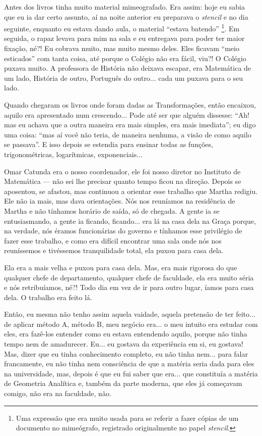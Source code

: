 \documentclass{hipatia}
\begin{document}
Antes dos livros tinha muito material mimeografado. Era assim: hoje eu
sabia que eu ia dar certo assunto, aí na noite anterior eu preparava o
\emph{stencil} e no dia seguinte, enquanto eu estava dando aula, o
material ``estava batendo'' \footnote{Uma expressão que era muito usada
  para se referir a fazer cópias de um documento no mimeógrafo,
  registrado originalmente no papel \emph{stencil}.}. Em seguida, o
rapaz levava para mim na sala e eu entregava para poder ter maior
fixação, né?! Eu cobrava muito, mas muito mesmo deles. Eles ficavam
``meio esticados'' com tanta coisa, até porque o Colégio não era fácil,
viu?! O Colégio puxava muito. A professora de História não deixava
escapar, era Matemática de um lado, História de outro, Português do
outro... cada um puxava para o seu lado.

Quando chegaram os livros onde foram dadas as Transformações, então
encaixou, aquilo era apresentado num crescendo... Pode até ser que
alguém dissesse: ``Ah! mas eu achava que a outra maneira era mais
simples, era mais imediata''; eu digo uma coisa: ``mas aí você não
teria, de maneira nenhuma, a visão de como aquilo se passava''. E isso
depois se estendia para ensinar todas as funções, trigonométricas,
logarítmicas, exponenciais...

Omar Catunda era o nosso coordenador, ele foi nosso diretor no Instituto
de Matemática --- não sei lhe precisar quanto tempo ficou na direção.
Depois se aposentou, se afastou, mas continuou a orientar esse trabalho
que Martha redigiu. Ele não ia mais, mas dava orientações. Nós nos
reuníamos na residência de Martha e não tínhamos horário de saída, só de
chegada. A gente ia se entusiasmando, a gente ia ficando, ficando... era
lá na casa dela na Graça porque, na verdade, nós éramos funcionárias do
governo e tínhamos esse privilégio de fazer esse trabalho, e como era
difícil encontrar uma sala onde nós nos reuníssemos e tivéssemos
tranquilidade total, ela puxou para casa dela.

Ela era a mais velha e puxou para casa dela. Mas, era mais rigorosa do
que qualquer chefe de departamento, qualquer chefe de faculdade, ela era
muito séria e nós retribuíamos, né?! Todo dia em vez de ir para outro
lugar, íamos para casa dela. O trabalho era feito lá.

Então, eu mesma não tenho assim aquela vaidade, aquela pretensão de ter
feito... de aplicar método A, método B, meu negócio era... o meu intuito
era estudar com eles, era fazê-los entender como eu estava entendendo
aquilo, porque não tinha tempo nem de amadurecer. Eu... eu gostava da
experiência em si, eu gostava! Mas, dizer que eu tinha conhecimento
completo, eu não tinha nem... para falar francamente, eu não tinha nem
consciência de que a matéria seria dada para eles na universidade, mas,
depois é que eu fui saber que era... que constituía a matéria de
Geometria Analítica e, também da parte moderna, que eles já começavam
comigo, não era na faculdade, não.
\end{document}
